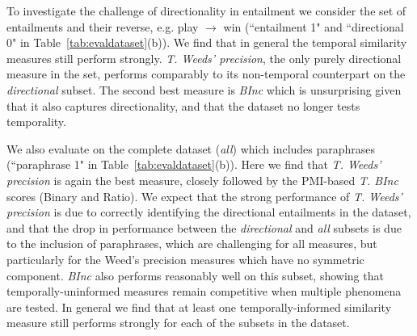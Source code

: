 \documentclass[11pt]{article}
\begin{document}
To investigate the challenge of directionality in entailment we consider the set of entailments and their reverse, e.g. play $\rightarrow$ win (``entailment 1" and ``directional 0" in Table~\ref{tab:evaldataset}(b)). We find that in general the temporal similarity measures still perform strongly. \textit{T. Weeds' precision}, the only purely directional measure in the set, performs comparably to its non-temporal counterpart on the \textit{directional} subset. The second best measure is \textit{BInc} which is unsurprising given that it also captures directionality, and that the dataset no longer tests temporality.

We also evaluate on the complete dataset (\textit{all}) which includes paraphrases (``paraphrase 1" in Table~\ref{tab:evaldataset}(b)). Here we find that \textit{T. Weeds' precision} is again the best measure, closely followed by the PMI-based \textit{T. BInc} scores (Binary and Ratio). We expect that the strong performance of \textit{T. Weeds' precision} is due to correctly identifying the directional entailments in the dataset, and that the drop in performance between the \textit{directional} and \textit{all} subsets is due to the inclusion of paraphrases, which are challenging for all measures, but particularly for the Weed's precision measures which have no symmetric component. \textit{BInc} also performs reasonably well on this subset, showing that temporally-uninformed measures remain competitive when multiple phenomena are tested. In general we find that at least one temporally-informed similarity measure still performs strongly for each of the subsets in the dataset.
\end{document}
